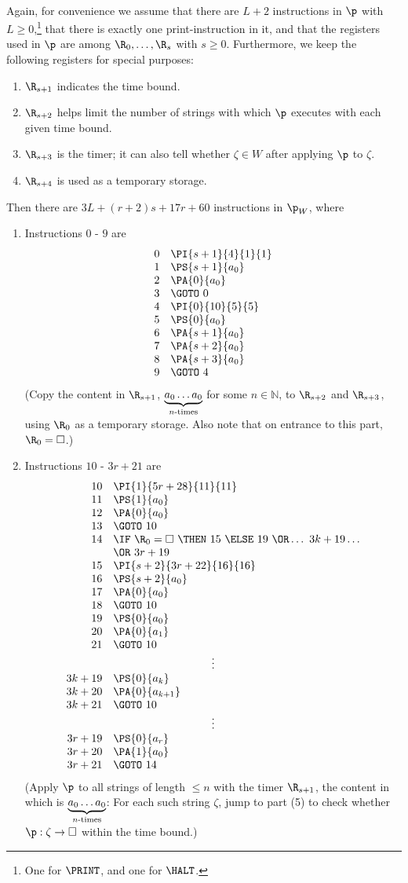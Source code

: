 \begin{enumerate}[1.]
\ \\
Again, for convenience we assume that there are $L + 2$ instructions in $\p$ with $L \geq 0$,\footnote{One for $\PRINT$, and one for $\HALT$.} that there is exactly one print-instruction in it, and that the registers used in $\p$ are among $\R_0, \ldots, \R_s$ with $s \geq 0$. Furthermore, we keep the following registers for special purposes:
\begin{enumerate}[1)]
\item $\R_{s + 1}$ indicates the time bound.
\item $\R_{s + 2}$ helps limit the number of strings with which $\p$ executes with each given time bound.
\item $\R_{s + 3}$ is the timer; it can also tell whether $\zeta \in W$ after applying $\p$ to $\zeta$.
\item $\R_{s + 4}$ is used as a temporary storage.
\end{enumerate}
Then there are $3L + (r + 2)s + 17r + 60$ instructions in $\p_W$, where
\begin{enumerate}[(1)]
\item Instructions $0$ - $9$ are
\[
\begin{array}{rl}
0 & \PI{s + 1}{4}{1}{1} \cr
1 & \PS{s + 1}{a_0} \cr
2 & \PA{0}{a_0} \cr
3 & \GOTO \ 0 \cr
4 & \PI{0}{10}{5}{5} \cr
5 & \PS{0}{a_0} \cr
6 & \PA{s + 1}{a_0} \cr
7 & \PA{s + 2}{a_0} \cr
8 & \PA{s + 3}{a_0} \cr
9 & \GOTO \ 4 \cr
\end{array}
\]
(Copy the content in $\R_{s + 1}$, $\underbrace{a_0 \ldots a_0}_{n\mbox{\scriptsize-times}}$ for some $n \in \mathbb{N}$, to $\R_{s + 2}$ and $\R_{s + 3}$, using $\R_0$ as a temporary storage. Also note that on entrance to this part, $\R_0 = \Box$.)
\item Instructions $10$ - $3r + 21$ are
\[
\begin{array}{rl}
10 & \PI{1}{5r + 28}{11}{11} \cr
11 & \PS{1}{a_0} \cr
12 & \PA{0}{a_0} \cr
13 & \GOTO \ 10 \cr
14 & \IF \ \R_0 = \Box \ \THEN \ 15 \ \ELSE \ 19 \ \OR \ldots \ 3k + 19 \ldots \cr
\  & \OR \ 3r + 19 \cr
15 & \PI{s + 2}{3r + 22}{16}{16} \cr
16 & \PS{s + 2}{a_0} \cr
17 & \PA{0}{a_0} \cr
18 & \GOTO \ 10 \cr
19 & \PS{0}{a_0} \cr
20 & \PA{0}{a_1} \cr
21 & \GOTO \ 10 \cr
\multicolumn{2}{c}{\vdots} \cr
3k + 19 & \PS{0}{a_k} \cr
3k + 20 & \PA{0}{a_{k + 1}} \cr
3k + 21 & \GOTO \ 10 \cr
\multicolumn{2}{c}{\vdots} \cr
3r + 19 & \PS{0}{a_r} \cr
3r + 20 & \PA{1}{a_0} \cr
3r + 21 & \GOTO \ 14 \cr
\end{array}
\]
(Apply $\p$ to all strings of length $\leq n$ with the timer $\R_{s + 1}$, the content in which is $\underbrace{a_0 \ldots a_0}_{n\mbox{\scriptsize-times}}$: For each such string $\zeta$, jump to part (5) to check whether $\p : \zeta \to \Box$ within the time bound.)

\end{enumerate}
\end{enumerate}
